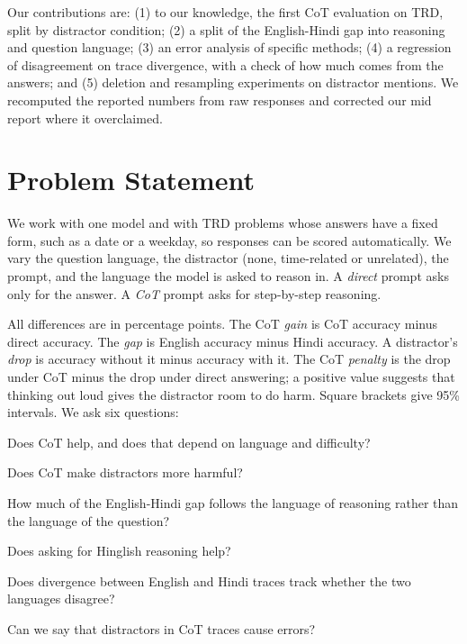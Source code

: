 \documentclass[11pt]{article}
\begin{document}
Our contributions are: (1) to our knowledge, the first CoT evaluation on TRD, split by distractor condition; (2) a split of the English-Hindi gap into reasoning and question language; (3) an error analysis of specific methods; (4) a regression of disagreement on trace divergence, with a check of how much comes from the answers; and (5) deletion and resampling experiments on distractor mentions. We recomputed the reported numbers from raw responses and corrected our mid report where it overclaimed.

\section{Problem Statement}
\label{sec:problem}

We work with one model and with TRD problems whose answers have a fixed form, such as a date or a weekday, so responses can be scored automatically. We vary the question language, the distractor (none, time-related or unrelated), the prompt, and the language the model is asked to reason in. A \emph{direct} prompt asks only for the answer. A \emph{CoT} prompt asks for step-by-step reasoning.

All differences are in percentage points. The CoT \emph{gain} is CoT accuracy minus direct accuracy. The \emph{gap} is English accuracy minus Hindi accuracy. A distractor's \emph{drop} is accuracy without it minus accuracy with it. The CoT \emph{penalty} is the drop under CoT minus the drop under direct answering; a positive value suggests that thinking out loud gives the distractor room to do harm. Square brackets give 95\% intervals. We ask six questions:
\begin{description}\setlength{\itemsep}{0pt}\setlength{\parskip}{1pt}
\item[RQ1] Does CoT help, and does that depend on language and difficulty?
\item[RQ2] Does CoT make distractors more harmful?
\item[RQ3] How much of the English-Hindi gap follows the language of reasoning rather than the language of the question?
\item[RQ4] Does asking for Hinglish reasoning help?
\item[RQ5] Does divergence between English and Hindi traces track whether the two languages disagree?
\item[RQ6] Can we say that distractors in CoT traces cause errors?
\end{description}
\end{document}
